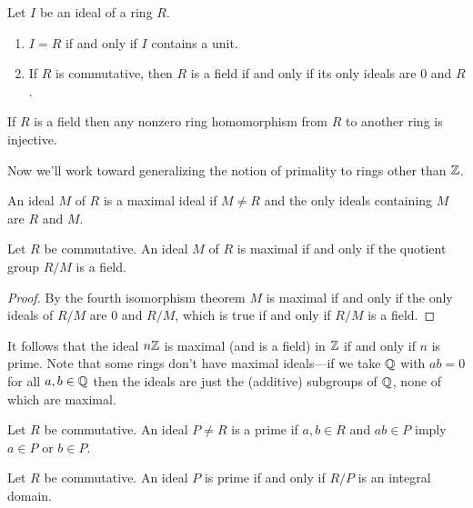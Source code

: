 \documentclass[../m171main.tex]{subfiles}
\begin{document}
\begin{theorem}[]
    Let $I$ be an ideal of a ring $R$.
    \begin{enumerate}[label=(\alph*),topsep=0pt]
        \item $I = R$ if and only if $I$ contains a unit.
        \item If $R$ is commutative, then $R$ is a field if and only if its only ideals are $0$ and $R$.
    \end{enumerate}
\end{theorem}

\begin{corollary}[]
    If $R$ is a field then any nonzero ring homomorphism from $R$ to another ring is injective.
\end{corollary}

Now we'll work toward generalizing the notion of primality to rings other than $\mathbb{Z}$.

\begin{definition}
    An ideal $M$ of $R$ is a maximal ideal if $M \neq R$ and the only ideals containing $M$ are $R$ and $M$.
\end{definition}

\begin{theorem}[]
    Let $R$ be commutative.
    An ideal $M$ of $R$ is maximal if and only if the quotient group $R / M$ is a field.
\end{theorem}

\begin{proof}
    By the fourth isomorphism theorem $M$ is maximal if and only if the only ideals of $R / M$ are $0$ and $R / M$, which is true if and only if $R / M$ is a field.
\end{proof}

It follows that the ideal $n \mathbb{Z}$ is maximal (and is a field) in $\mathbb{Z}$ if and only if $n$ is prime.
Note that some rings don't have maximal ideals---if we take $\mathbb{Q}$ with $ab = 0$ for all $a,b \in \mathbb{Q}$ then the ideals are just the (additive) subgroups of $\mathbb{Q}$, none of which are maximal.

\pagebreak

\begin{definition}
    Let $R$ be commutative.
    An ideal $P \neq R$ is a prime if $a,b \in R$ and $ab \in P$ imply $a \in P$ or $b \in P$.
\end{definition}

\begin{theorem}[]
    Let $R$ be commutative.
    An ideal $P$ is prime if and only if $R / P$ is an integral domain.
\end{theorem}
\end{document}
